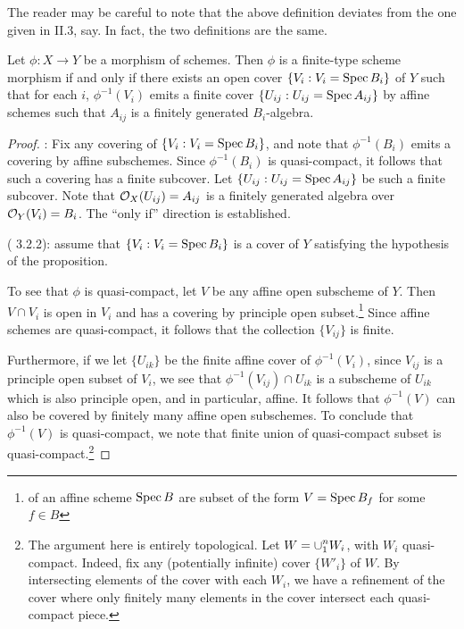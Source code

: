 The reader may be careful to note that the above definition
deviates from the one given in \cite{Hart} II.3, say. In fact,
the two definitions are the same.

\begin{prop}
Let $\phi: X \to Y$ be a morphism of schemes. Then $\phi$ is a 
finite-type scheme morphism if and only if there exists an open 
cover $\{V_i : V_i = \mathrm{Spec}\, B_i \}$ of $Y$ such that for each $i$, 
$\phi^{-1}(V_i)$ emits a finite cover $\{U_{ij} : U_{ij} = \mathrm{Spec}\, 
A_{ij}\}$ by affine schemes such that $A_{ij}$ is a finitely 
generated $B_i$-algebra.
\end{prop}
\begin{proof}
\pfitem{$\Rightarrow$}: Fix any covering of $\{V_i : V_i = \mathrm{Spec}\, 
B_i\}$, and note that $\phi^{-1}(B_i)$ emits a covering by affine
subschemes. Since $\phi^{-1}(B_i)$ is quasi-compact, it follows that
such a covering has a finite subcover. Let $\{U_{ij} : U_{ij} = 
\mathrm{Spec}\, A_{ij}\}$ be such a finite subcover. Note that $\mathcal{O}_X(U_{ij}) 
= A_{ij}$ is a finitely generated algebra over $\mathcal{O}_Y(V_i) = B_i$.
The ``only if'' direction is established.

\pfitem{$\Leftarrow$} (\cite{Liu} 3.2.2): assume that $\{V_i :
V_i = \mathrm{Spec}\, B_i\}$ is a cover of $Y$ satisfying the hypothesis
of the proposition.

To see that $\phi$ is quasi-compact, let $V$ be any affine open 
subscheme of $Y$. Then $V \cap V_i$ is open in $V_i$ and has a
covering by principle open subset.\footnote{ of an affine scheme $\mathrm{Spec}\, B$ are 
subset of the form $V = \mathrm{Spec}\, B_f$ for some $f \in B$} Since 
affine schemes are quasi-compact, it follows that the collection 
$\{V_{ij}\}$ is finite.

Furthermore, if we let $\{U_{ik}\}$ be the finite affine cover of 
$\phi^{-1}(V_i)$, since $V_{ij}$ is a principle open subset of 
$V_i$, we see that $\phi^{-1}(V_{ij}) \cap U_{ik}$ is a subscheme 
of $U_{ik}$ which is also principle open, and in particular, 
affine.  It follows that $\phi^{-1}(V)$ can also be covered by 
finitely many affine open subschemes. To conclude that 
$\phi^{-1}(V)$ is quasi-compact, we note that finite union of 
quasi-compact subset is quasi-compact.\footnote{The argument here 
is entirely topological. Let $\displaystyle W = \cup_1^n W_i$, with $W_i$ 
quasi-compact. Indeed, fix any (potentially infinite) cover 
$\{W'_i\}$ of $W$. By intersecting elements of the cover with each 
$W_i$, we have a refinement of the cover where only finitely many 
elements in the cover intersect each quasi-compact piece.}


\end{proof}
